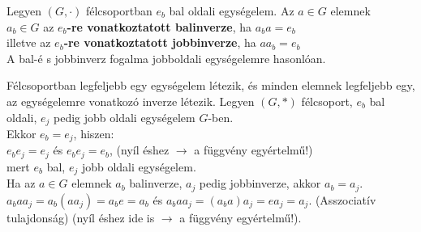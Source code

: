 \begin{frame}
    \begin{tcolorbox}[title={Def.: Balinverz, Jobbinverz, Inverz (Félcsoport)}]
    Legyen $(G, {\cdot})$ félcsoportban $e_b$ bal oldali egységelem. Az $a \in G$ elemnek \\
    $a_b \in G$ az \textbf{$e_b$-re vonatkoztatott balinverze}, ha $a_ba = e_b$\\
    illetve az \textbf{$e_b$-re vonatkoztatott jobbinverze}, ha $aa_b = e_b$\\
    A bal-é s jobbinverz fogalma jobboldali egységelemre hasonlóan.
  \end{tcolorbox}
\end{frame}


\begin{frame}
  \begin{tcolorbox}[title={Tétel: Egységelem és inverz félcsoportban}]
    Félcsoportban legfeljebb egy egységelem létezik, és minden elemnek legfeljebb egy, az egységelemre vonatkozó inverze létezik.
  \tcblower
    Legyen $(G, *)$ félcsoport, $e_b$ bal oldali, $e_j$ pedig jobb oldali egységelem $G$-ben.\\
    Ekkor $e_b = e_j$, hiszen:\\
    $e_be_j = e_j$ és $e_be_j = e_b$, (nyíl éshez $\rightarrow$ a függvény egyértelmű!)\\
    mert $e_b$ bal, $e_j$ jobb oldali egységelem.\\
    Ha az $a \in G$ elemnek $a_b$ balinverze, $a_j$ pedig jobbinverze, akkor $a_b = a_j$.
    $a_baa_j = a_b(aa_j) = a_be = a_b$ és $a_baa_j = (a_ba)a_j = ea_j = a_j$. (Asszociatív tulajdonság) (nyíl éshez ide is $\rightarrow$ a függvény egyértelmű!).
  \end{tcolorbox}
\end{frame}

